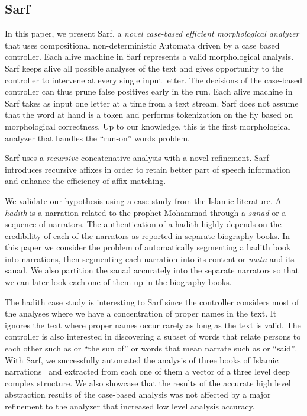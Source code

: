 \documentclass[11pt,letterpaper]{article}
\begin{document}
\subsection{Sarf}
\label{sec:intro:sarf}

In this paper, we present Sarf, a {\em novel case-based efficient
morphological analyzer} that uses compositional 
non-deterministic Automata driven by a case based controller.
Each alive machine in Sarf represents a valid morphological analysis. 
Sarf keeps alive all possible analyses of the text and gives 
opportunity to the controller to intervene at every single input 
letter. 
The decisions of the case-based controller can thus prune false 
positives early in the run. 
Each alive machine in Sarf takes as input one letter at a time 
from a text stream. 
Sarf does not assume that the word at hand is a token and
performs tokenization on the fly based on morphological correctness.
Up to our knowledge, this is the first morphological analyzer that 
handles the ``run-on'' words problem. 

Sarf uses a {\em recursive} concatenative analysis with a novel 
refinement. 
Sarf introduces recursive affixes in order to
retain better part of speech information and enhance the 
efficiency of affix matching. 

We validate our hypothesis using a case study from the Islamic 
literature. 
A {\em hadith} is a narration related to the prophet Mohammad
through a {\em sanad} or a sequence of narrators. 
The authentication of a hadith highly depends on the credibility
of each of the narrators as reported in separate biography 
books. 
In this paper we consider the problem of automatically segmenting
a hadith book into narrations, then segmenting each narration into
its content or {\em matn} and its sanad.
We also partition the sanad accurately into the 
separate narrators so that we can later look each one of them 
up in the biography books. 

The hadith case study is interesting to Sarf since the controller
considers most of the analyses where we have a concentration
of proper names in the text. It ignores the text where
proper names occur rarely as long 
as the text is valid.
The controller is also interested in discovering a subset of words 
that relate persons to each other such as  or ``the sun of''
or words that mean narrate such as  or ``said''. 
With Sarf, we successfully automated the analysis of 
three books of Islamic narrations~\cite{IbnHanbal,AlTousi,AlKulayni}
and extracted from each one of them a vector of a three level deep
complex structure. 
We also showcase that the results of the accurate high level abstraction
results of the case-based analysis was not affected by a major
refinement to the analyzer that increased low level analysis accuracy. 
\end{document}

